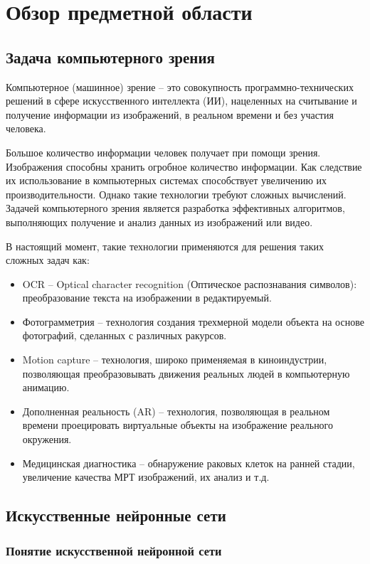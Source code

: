 \section{Обзор предметной области}
\subsection{Задача компьютерного зрения}
Компьютерное (машинное) зрение – это совокупность программно-технических решений в сфере искусственного интеллекта (ИИ), нацеленных на считывание и получение информации из изображений, в реальном времени и без участия человека. 

Большое количество информации человек получает при помощи зрения. 
Изображения способны хранить огробное количество информации. Как следствие их использование в компьютерных системах способствует увеличению их производительности. Однако такие технологии требуют сложных вычислений. Задачей компьютерного зрения является разработка эффективных алгоритмов, выполняющих получение и анализ данных из изображений или видео. 
 
В настоящий момент, такие технологии применяются для решения таких сложных задач как:
\begin{itemize}
    \item OCR – Optical character recognition (Оптическое распознавания символов): преобразование текста на изображении в редактируемый.
    \item Фотограмметрия – технология создания трехмерной модели объекта на основе фотографий, сделанных с различных ракурсов.
    \item Motion capture – технология, широко применяемая в киноиндустрии, позволяющая преобразовывать движения реальных людей в компьютерную анимацию.
    \item Дополненная реальность (AR) – технология, позволяющая в реальном времени проецировать виртуальные объекты на изображение реального окружения. 
    \item Медицинская диагностика – обнаружение раковых клеток на ранней стадии, увеличение качества МРТ изображений, их анализ и т.д.
\end{itemize}
\subsection{Искусственные нейронные сети}

\subsubsection{Понятие искусственной нейронной сети}

